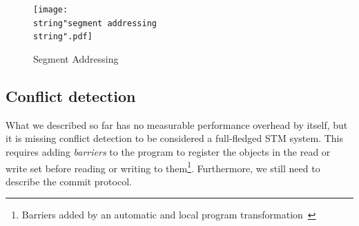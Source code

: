 \documentclass{sigplanconf}
\begin{document}
\begin{figure}[t]
  \centering
  \texttt{[image: \\string"segment addressing\\string".pdf]}
  \caption{Segment Addressing\label{fig:Segment-Addressing}}
\end{figure}


\subsection{Conflict detection}

What we described so far has no measurable performance overhead by
itself, but it is missing conflict detection to be considered a
full-fledged STM system.  This requires adding \emph{barriers} to the
program to register the objects in the read or write set before
reading or writing to them\footnote{Barriers added by an automatic and
local program transformation~\cite{felber07}}.  Furthermore, we still
need to describe the commit protocol.
\end{document}
